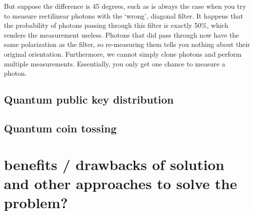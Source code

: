 \documentclass[oneside,a4paper]{article}
\begin{document}
But suppose the difference is 45 degrees, such as is always the case when you try to measure rectilinear photons with the `wrong', diagonal filter. 
It happens that the probability of photons passing through this filter is exactly 50\%, which renders the measurement useless.
Photons that did pass through now have the same polarization as the filter, so re-measuring them tells you nothing about their original orientation.
Furthermore, we cannot simply clone photons and perform multiple measurements.
Essentially, you only get one chance to measure a photon.


\subsection{Quantum public key distribution}


\subsection{Quantum coin tossing}

\section{benefits / drawbacks of solution  and other approaches to solve the problem?}




\end{document}
